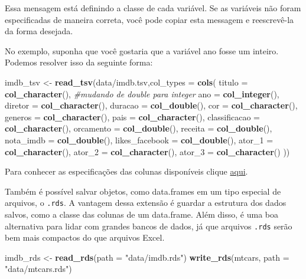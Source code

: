\documentclass[
]{book}
\newenvironment{Shaded}{\begin{snugshade}}{\end{snugshade}}
\newcommand{\CommentTok}[1]{\textcolor[rgb]{0.56,0.35,0.01}{\textit{#1}}}
\newcommand{\DataTypeTok}[1]{\textcolor[rgb]{0.13,0.29,0.53}{#1}}
\newcommand{\KeywordTok}[1]{\textcolor[rgb]{0.13,0.29,0.53}{\textbf{#1}}}
\newcommand{\NormalTok}[1]{#1}
\newcommand{\StringTok}[1]{\textcolor[rgb]{0.31,0.60,0.02}{#1}}
\begin{document}
Essa mensagem está definindo a classe de cada variável. Se as variáveis não foram especificadas de maneira correta, você pode copiar esta messagem e reescrevê-la da forma desejada.

No exemplo, suponha que você gostaria que a variável ano fosse um inteiro. Podemos resolver isso da seguinte forma:

\begin{Shaded}
\begin{Highlighting}[]
\NormalTok{imdb\_tsv <{-}}\StringTok{ }\KeywordTok{read\_tsv}\NormalTok{(}\StringTok{\textquotesingle{}data/imdb.tsv\textquotesingle{}}\NormalTok{,}\DataTypeTok{col\_types =}  
 \KeywordTok{cols}\NormalTok{(}
  \DataTypeTok{titulo =} \KeywordTok{col\_character}\NormalTok{(),}
  \CommentTok{\#mudando de double para integer}
  \DataTypeTok{ano =} \KeywordTok{col\_integer}\NormalTok{(),}
  \DataTypeTok{diretor =} \KeywordTok{col\_character}\NormalTok{(),}
  \DataTypeTok{duracao =} \KeywordTok{col\_double}\NormalTok{(),}
  \DataTypeTok{cor =} \KeywordTok{col\_character}\NormalTok{(),}
  \DataTypeTok{generos =} \KeywordTok{col\_character}\NormalTok{(),}
  \DataTypeTok{pais =} \KeywordTok{col\_character}\NormalTok{(),}
  \DataTypeTok{classificacao =} \KeywordTok{col\_character}\NormalTok{(),}
  \DataTypeTok{orcamento =} \KeywordTok{col\_double}\NormalTok{(),}
  \DataTypeTok{receita =} \KeywordTok{col\_double}\NormalTok{(),}
  \DataTypeTok{nota\_imdb =} \KeywordTok{col\_double}\NormalTok{(),}
  \DataTypeTok{likes\_facebook =} \KeywordTok{col\_double}\NormalTok{(),}
  \DataTypeTok{ator\_1 =} \KeywordTok{col\_character}\NormalTok{(),}
  \DataTypeTok{ator\_2 =} \KeywordTok{col\_character}\NormalTok{(),}
  \DataTypeTok{ator\_3 =} \KeywordTok{col\_character}\NormalTok{()}
\NormalTok{))}
\end{Highlighting}
\end{Shaded}

Para conhecer as especificações das colunas disponíveis clique \href{https://readr.tidyverse.org/articles/readr.html\#available-column-specifications}{aqui}.

Também é possível salvar objetos, como data.frames em um tipo especial de arquivos, o \texttt{.rds}. A vantagem dessa extensão é guardar a estrutura dos dados salvos, como a classe das colunas de um data.frame. Além disso, é uma boa alternativa para lidar com grandes bancos de dados, já que arquivos \texttt{.rds} serão bem mais compactos do que arquivos Excel.

\begin{Shaded}
\begin{Highlighting}[]
\NormalTok{imdb\_rds <{-}}\StringTok{ }\KeywordTok{read\_rds}\NormalTok{(}\DataTypeTok{path =} \StringTok{"data/imdb.rds"}\NormalTok{)}
\KeywordTok{write\_rds}\NormalTok{(mtcars, }\DataTypeTok{path =} \StringTok{"data/mtcars.rds"}\NormalTok{)}
\end{Highlighting}
\end{Shaded}
\end{document}
